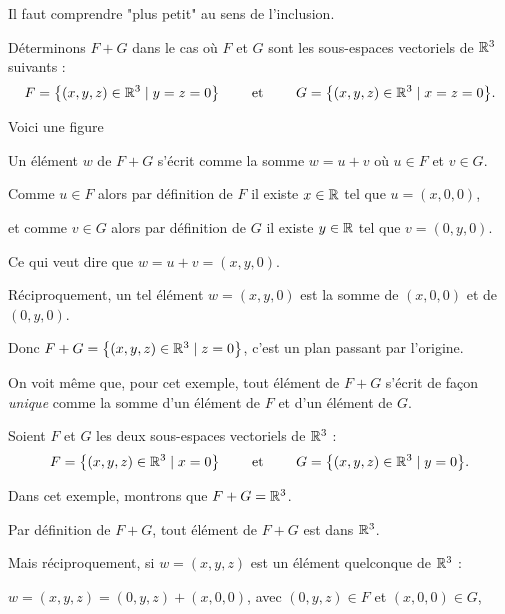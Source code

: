 Il faut comprendre "plus petit" au sens de l'inclusion.



\diapo


Déterminons $F+G$  dans le cas où $F$ et $G$ sont les sous-espaces vectoriels de 
$\mathbb{R}^3$ suivants : 
$$F=\big\{(x,y,z) \in \mathbb{R}^3\mid y=z=0\big\} 
\qquad\text{ et }\qquad 
G=\big\{(x,y,z) \in \mathbb{R}^3 \mid x=z=0\big\}.$$

\change
Voici une figure

\change

Un élément $w$ de $F+G$ s'écrit comme la somme $w=u+v$ où $u \in F$  et $v \in G$. 

\change

Comme $u\in F$ alors par définition de $F$ il existe $x \in \mathbb{R}$ tel que $u=(x,0,0)$, 

\change

et comme $v \in G$ alors par définition de $G$ il existe $y \in \mathbb{R}$ tel que $v=(0,y,0)$. 

\change

Ce qui veut dire que $w=u+v=(x,y,0)$. 


Réciproquement, un tel élément $w=(x,y,0)$ est la somme de $(x,0,0)$ 
et de $(0,y,0)$. 

\change

Donc $F+G=\big\{(x,y,z) \in \mathbb{R}^3\mid z=0\big\}$, c'est un plan passant par l'origine.


On voit même que, pour cet exemple, tout élément de $F+G$ s'écrit 
de façon \emph{unique} comme la somme d'un élément de $F$ et d'un élément de $G$.



\diapo

Soient $F$ et $G$ les deux sous-espaces vectoriels de $\mathbb{R}^3$ : 
$$F=\big\{(x,y,z) \in \mathbb{R}^3\mid x=0\big\}
\qquad \text{ et } \qquad 
G=\big\{(x,y,z) \in \mathbb{R}^3 \mid y=0\big\}.$$

\change


Dans cet exemple, montrons que $F+G=\mathbb{R}^3$.

Par définition de $F+G$, tout élément de  $F+G$ est dans $\mathbb{R}^3$.

\change

Mais réciproquement, si  $w=(x,y,z)$ est un élément quelconque
de $\mathbb{R}^3$ : 

\change

$w=(x,y,z)=(0,y,z)+(x,0,0)$, avec
$(0,y,z) \in F$ et $(x,0,0) \in G$, 

